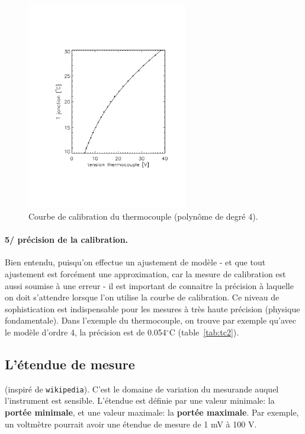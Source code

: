 \begin{figure}
\vspace{-0mm}
   \centering
   \includegraphics[width=7cm]{assets/figures/calibThermoCouple.pdf}
   \caption{Courbe de calibration du thermocouple (polynôme de degré 4).}
   \label{fig:tc}
\end{figure}
\paragraph{5/ précision de la calibration.} Bien entendu, puisqu'on effectue un ajustement de modèle - et que tout ajustement est forcément une approximation, car la mesure de calibration est aussi soumise à une erreur - il est important de connaitre la précision à laquelle on doit s'attendre lorsque l'on utilise la courbe de calibration. Ce niveau de sophistication est indispensable pour les mesures à très haute précision (physique fondamentale). Dans l'exemple du thermocouple, on trouve par exemple qu'avec le modèle d'ordre 4, la précision est de 0.054$^\circ$C (table~\ref{tab:tc2}).

\subsection{L'étendue de mesure}\label{sec:etd}

(inspiré de \texttt{wikipedia}). C'est le domaine de variation du mesurande auquel l'instrument est sensible. L'étendue est définie par une valeur minimale: la \textbf{portée minimale}, et une valeur maximale: la \textbf{portée maximale}. Par exemple, un voltmètre pourrait avoir une étendue de mesure de 1 mV à 100 V.


